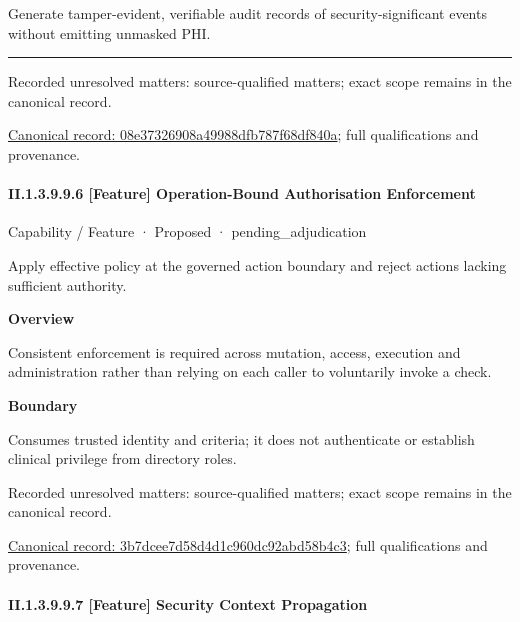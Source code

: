 Generate tamper-evident, verifiable audit records of security-significant events without emitting unmasked PHI.



\medskip\hrule\medskip

{\small Recorded unresolved matters: source-qualified matters; exact scope remains in the canonical record.}\par
{\footnotesize \href{../../../../../../../continuum/strategy/capability/feature/08e37326908a49988dfb787f68df840a.md}{Canonical record: 08e37326908a49988dfb787f68df840a}; full qualifications and provenance.}\par
\paragraph*{II.1.3.9.9.6 [Feature] Operation-Bound Authorisation Enforcement}
\label{navigation:II.1.3.9.9.6}

\label{element:3b7dcee7d58d4d1c960dc92abd58b4c3}
{\small Capability / Feature · Proposed · pending\_adjudication}\par

Apply effective policy at the governed action boundary and reject actions lacking sufficient authority.



\textbf{Overview}



Consistent enforcement is required across mutation, access, execution and administration rather than relying on each caller to voluntarily invoke a check.



\textbf{Boundary}



Consumes trusted identity and criteria; it does not authenticate or establish clinical privilege from directory roles.


{\small Recorded unresolved matters: source-qualified matters; exact scope remains in the canonical record.}\par
{\footnotesize \href{../../../../../../../continuum/strategy/capability/feature/3b7dcee7d58d4d1c960dc92abd58b4c3.md}{Canonical record: 3b7dcee7d58d4d1c960dc92abd58b4c3}; full qualifications and provenance.}\par
\paragraph*{II.1.3.9.9.7 [Feature] Security Context Propagation}
\label{navigation:II.1.3.9.9.7}


